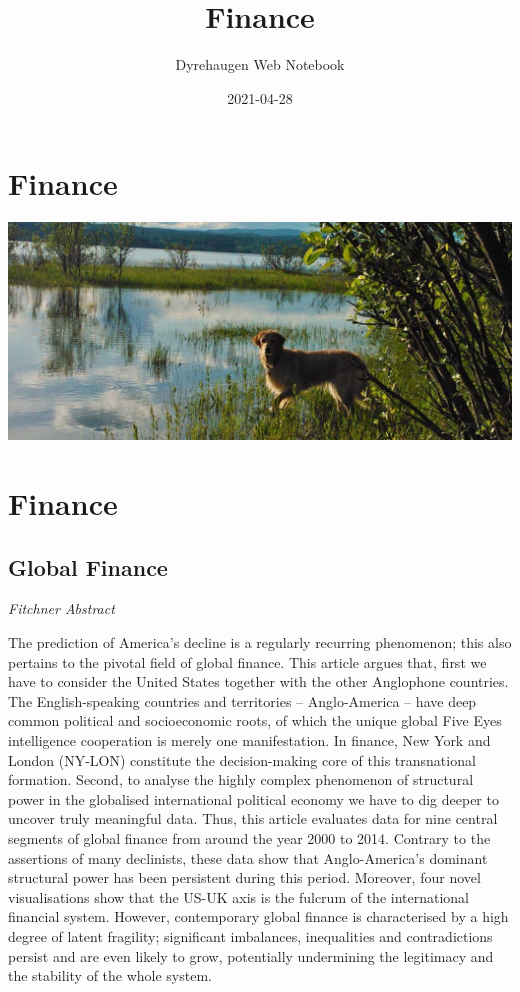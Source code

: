 \documentclass[
]{book}
\title{Finance}
\author{Dyrehaugen Web Notebook}
\date{2021-04-28}
\begin{document}
\maketitle

{
\setcounter{tocdepth}{1}
\tableofcontents
}
\hypertarget{finance}{%
\chapter{Finance}\label{finance}}

\includegraphics{fig/zelda.jpg}

\hypertarget{finance-1}{%
\chapter{Finance}\label{finance-1}}

\hypertarget{global-finance}{%
\section{Global Finance}\label{global-finance}}

\emph{Fitchner Abstract}

The prediction of America's decline is a regularly recurring phenomenon; this also pertains to the
pivotal field of global finance. This article argues that, first we have to consider the United States
together with the other Anglophone countries. The English-speaking countries and territories --
Anglo-America -- have deep common political and socioeconomic roots, of which the unique global Five
Eyes intelligence cooperation is merely one manifestation. In finance, New York and London
(NY-LON) constitute the decision-making core of this transnational formation. Second, to analyse the
highly complex phenomenon of structural power in the globalised international political economy we
have to dig deeper to uncover truly meaningful data. Thus, this article evaluates data for nine central
segments of global finance from around the year 2000 to 2014. Contrary to the assertions of many
declinists, these data show that Anglo-America's dominant structural power has been persistent during
this period. Moreover, four novel visualisations show that the US-UK axis is the fulcrum of the
international financial system. However, contemporary global finance is characterised by a high degree
of latent fragility; significant imbalances, inequalities and contradictions persist and are even likely to
grow, potentially undermining the legitimacy and the stability of the whole system.
\end{document}
